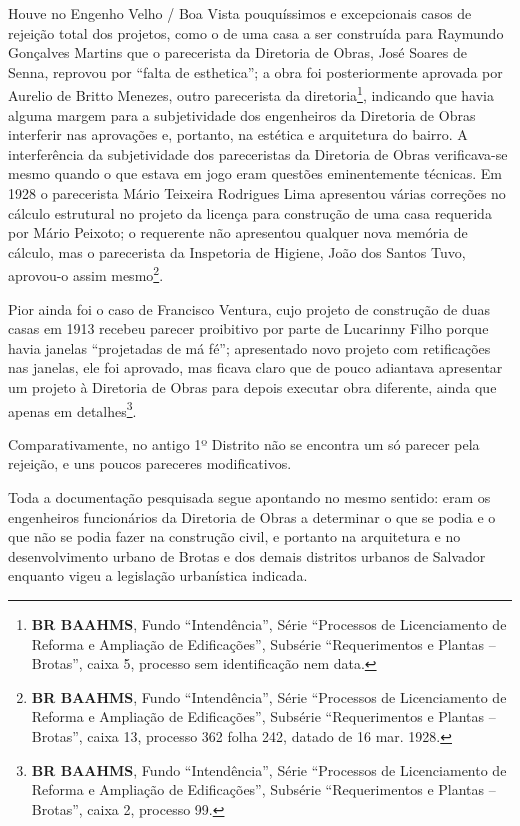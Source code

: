 Houve no Engenho Velho / Boa Vista pouquíssimos e excepcionais casos de rejeição total dos projetos, como o de uma casa a ser construída para Raymundo Gonçalves Martins que o parecerista da Diretoria de Obras, José Soares de Senna, reprovou por ``falta de esthetica''; a obra foi posteriormente aprovada por Aurelio de Britto Menezes, outro parecerista da diretoria\footnote{\textbf{BR BAAHMS}, Fundo ``Intendência'', Série ``Processos de Licenciamento de Reforma e Ampliação de Edificações'', Subsérie ``Requerimentos e Plantas – Brotas'', caixa 5, processo sem identificação nem data.}, indicando que havia alguma margem para a subjetividade dos engenheiros da Diretoria de Obras interferir nas aprovações e, portanto, na estética e arquitetura do bairro. A interferência da subjetividade dos pareceristas da Diretoria de Obras verificava-se mesmo quando o que estava em jogo eram questões eminentemente técnicas. Em 1928 o parecerista Mário Teixeira Rodrigues Lima apresentou várias correções no cálculo estrutural no projeto da licença para construção de uma casa requerida por Mário Peixoto; o requerente não apresentou qualquer nova memória de cálculo, mas o parecerista da Inspetoria de Higiene, João dos Santos Tuvo, aprovou-o assim mesmo\footnote{\textbf{BR BAAHMS}, Fundo ``Intendência'', Série ``Processos de Licenciamento de Reforma e Ampliação de Edificações'', Subsérie ``Requerimentos e Plantas – Brotas'', caixa 13, processo 362 folha 242, datado de 16 mar. 1928.}. 

Pior ainda foi o caso de Francisco Ventura, cujo projeto de construção de duas casas em 1913 recebeu parecer proibitivo por parte de Lucarinny Filho porque havia janelas ``projetadas de má fé''; apresentado novo projeto com retificações nas janelas, ele foi aprovado, mas ficava claro que de pouco adiantava apresentar um projeto à Diretoria de Obras para depois executar obra diferente, ainda que apenas em detalhes\footnote{\textbf{BR BAAHMS}, Fundo ``Intendência'', Série ``Processos de Licenciamento de Reforma e Ampliação de Edificações'', Subsérie ``Requerimentos e Plantas – Brotas'', caixa 2, processo 99.}.

Comparativamente, no antigo 1º Distrito não se encontra um só parecer pela rejeição, e uns poucos pareceres modificativos.  

Toda a documentação pesquisada segue apontando no mesmo sentido: eram os engenheiros funcionários da Diretoria de Obras a determinar o que se podia e o que não se podia fazer na construção civil, e portanto na arquitetura e no desenvolvimento urbano de Brotas e dos demais distritos urbanos de Salvador enquanto vigeu a legislação urbanística indicada.

